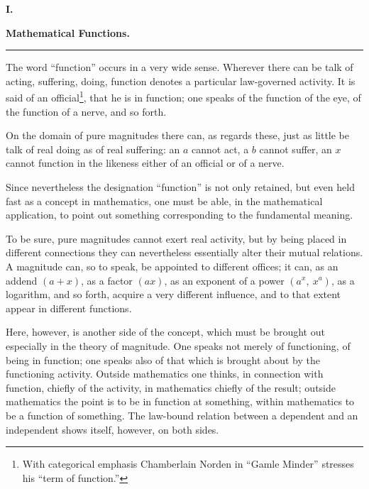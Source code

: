 \documentclass[12pt]{book}
\begin{document}
\begin{center}
  {\large\bfseries I.}\par\vspace{4pt}
  {\Large\bfseries Mathematical Functions.}\par\vspace{4pt}
  \rule{2.5cm}{0.4pt}
\end{center}
{}

\noindent The word ``function'' occurs in a very wide sense. Wherever there can
be talk of acting, suffering, doing, function denotes a particular law-governed
activity. It is said of an official\footnote{With categorical emphasis
Chamberlain Norden in ``Gamle Minder'' stresses his ``term of function.''}, that
he is in function; one speaks of the function of the eye, of the function of a
nerve, and so forth.

On the domain of pure magnitudes there can, as regards these, just as little be
talk of real doing as of real suffering: an $a$ cannot act, a $b$ cannot suffer,
an $x$ cannot function in the likeness either of an official or of a nerve.

Since nevertheless the designation ``function'' is not only retained, but even
held fast as a concept in mathematics, one must be able, in the mathematical
application, to point out something corresponding to the fundamental meaning.

To be sure, pure magnitudes cannot exert real activity, but by being placed in
different connections they can nevertheless essentially alter their mutual
relations. A magnitude can, so to speak, be appointed to different offices; it
can, as an addend $(a+x)$, as a factor $(ax)$, as an exponent of a power
$(a^{x},\ x^{a})$, as a logarithm, and so forth, acquire a
very different influence, and to that extent appear in different functions.

Here, however, is another side of the concept, which must be brought out
especially in the theory of magnitude. One speaks not merely of functioning, of
being in function; one speaks also of that which is brought about by the
functioning activity. Outside mathematics one thinks, in connection with
function, chiefly of the activity, in mathematics chiefly of the result;
outside mathematics the point is to be in function at something, within
mathematics to be a function of something. The law-bound relation between a
dependent and an independent shows itself, however, on both sides.
\end{document}
